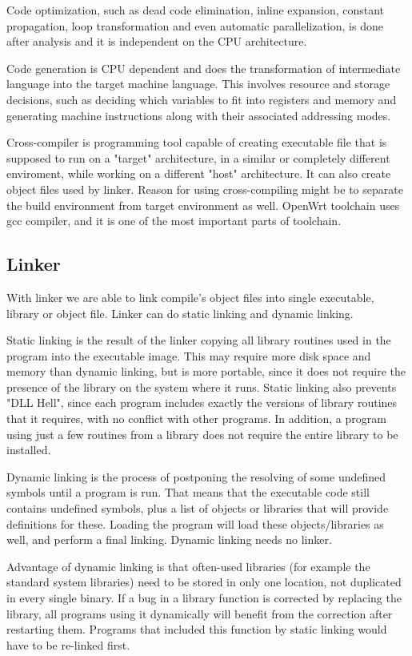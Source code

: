 Code optimization, such as dead code elimination, inline expansion, constant propagation, loop transformation and even automatic parallelization, is done after analysis and it is independent on the CPU architecture.

Code generation is CPU dependent and does the transformation of intermediate language into the target machine language.
This involves resource and storage decisions, such as deciding which variables to fit into registers and memory and generating machine instructions along with their associated addressing modes.

Cross-compiler is programming tool capable of creating executable file that is supposed to run on a "target" architecture, in a similar or completely different enviroment, while working on a different "host" architecture.
It can also create object files used by linker.
Reason for using cross-compiling might be to separate the build environment from target environment as well.
OpenWrt toolchain uses gcc compiler, and it is one of the most important parts of toolchain\cite{compiler}.

\subsection{Linker}

With linker we are able to link compile's object files into single executable, library or object file.
Linker can do static linking and dynamic linking.

Static linking is the result of the linker copying all library routines used in the program into the executable image.
This may require more disk space and memory than dynamic linking, but is more portable, since it does not require the presence of the library on the system where it runs.
Static linking also prevents "DLL Hell", since each program includes exactly the versions of library routines that it requires, with no conflict with other programs. In addition, a program using just a few routines from a library does not require the entire library to be installed.

Dynamic linking is the process of postponing the resolving of some undefined symbols until a program is run.
That means that the executable code still contains undefined symbols, plus a list of objects or libraries that will provide definitions for these.
Loading the program will load these objects/libraries as well, and perform a final linking.
Dynamic linking needs no linker.

Advantage of dynamic linking is that often-used libraries (for example the standard system libraries) need to be stored in only one location, not duplicated in every single binary.
If a bug in a library function is corrected by replacing the library, all programs using it dynamically will benefit from the correction after restarting them.
Programs that included this function by static linking would have to be re-linked first.

